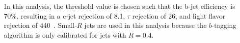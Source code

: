 In this analysis, the threshold value is chosen such that the b-jet efficiency is 70\%, resulting in a c-jet rejection of 8.1, $\tau$ rejection of 26, and light flavor rejection of 440~\cite{jet-btag-mv2}.
Small-$R$ jets are used in this analysis because the $b$-tagging algorithm is only calibrated for jets with $R=0.4$.
